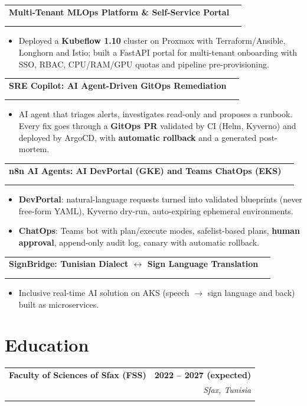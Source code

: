 \documentclass[a4paper,10pt]{article}
\makeatletter
\newcommand{\entry}[4]{%
\vspace{2pt}
\begin{tabular*}{\textwidth}{@{}l@{\extracolsep{\fill}}r@{}}
\textbf{#1} & \textbf{\small #2} \\
\ifstrempty{#3#4}{}{\textit{\small #3} & \textit{\small #4} \\}
\end{tabular*}\par\vspace{-1pt}
}
\makeatother
\begin{document}
\entry
{Multi-Tenant MLOps Platform \& Self-Service Portal}
{}{\small Proxmox, Terraform, Ansible, MicroK8s, Kubeflow, Istio, Longhorn, FastAPI}{}
\begin{itemize}
\item Deployed a \textbf{Kubeflow 1.10} cluster on Proxmox with Terraform/Ansible, Longhorn and Istio;
built a FastAPI portal for multi-tenant onboarding with SSO, RBAC, CPU/RAM/GPU quotas and pipeline pre-provisioning.
\end{itemize}

\entry
{SRE Copilot: AI Agent-Driven GitOps Remediation}
{}{\small AKS, n8n, Azure OpenAI, ArgoCD, Prometheus, Kyverno}{}
\begin{itemize}
\item AI agent that triages alerts, investigates read-only and proposes a runbook. Every fix goes through a
\textbf{GitOps PR} validated by CI (Helm, Kyverno) and deployed by ArgoCD, with \textbf{automatic rollback} and a generated post-mortem.
\end{itemize}

\entry
{n8n AI Agents: AI DevPortal (GKE) and Teams ChatOps (EKS)}
{}{\small n8n, Vertex AI, AWS Bedrock, ArgoCD/Rollouts, Kyverno, AWS IAM}{}
\begin{itemize}
\item \textbf{DevPortal}: natural-language requests turned into validated blueprints (never free-form YAML), Kyverno dry-run, auto-expiring ephemeral environments.
\item \textbf{ChatOps}: Teams bot with plan/execute modes, safelist-based plans, \textbf{human approval}, append-only audit log, canary with automatic rollback.
\end{itemize}

\entry
{SignBridge: Tunisian Dialect $\leftrightarrow$ Sign Language Translation}
{}{\small Azure AKS, ACR, FastAPI, STT/TTS, BiLSTM, MediaPipe}{}
\begin{itemize}
\item Inclusive real-time AI solution on AKS (speech $\rightarrow$ sign language and back) built as microservices.
\end{itemize}

\section{Education}
\small

\entry
{Faculty of Sciences of Sfax (FSS)}
{2022 -- 2027 (expected)}
{Engineering Degree in Data Engineering (5-year program), after integrated preparatory cycle (2 years)}
{Sfax, Tunisia}
\end{document}
